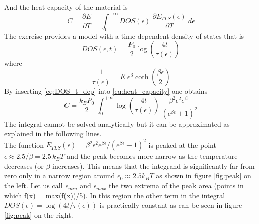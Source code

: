 \documentclass{article}
\begin{document}
And the heat capacity of the material is 
\begin{equation}
    C = \frac{\partial E}{\partial T} = \int_0^{+\infty} DOS(\epsilon) \ \frac{\partial E_{TLS}(\epsilon)}{\partial T} \ d\epsilon
    \label{eq:heat_capacity}
\end{equation}
The exercise provides a model with a time dependent density of states that is
\begin{equation}
    DOS(\epsilon, t) = \frac{P_0}{2}\log\left(\frac{4t}{\tau(\epsilon)}\right)
    \label{eq:DOS_t_dep}
\end{equation}
where
\begin{equation}
    \frac{1}{\tau(\epsilon)} = K \, \epsilon^3 \coth\left(\frac{\beta\epsilon}{2}\right)
    \label{eq:tau_eps}
\end{equation}
By inserting \ref{eq:DOS_t_dep} into \ref{eq:heat_capacity} one obtains
\begin{equation}
    C = \frac{k_BP_0}{2} \ \int_0^{+\infty} \log\left(\frac{4t}{\tau(\epsilon)}\right) \ \frac{\beta^2\epsilon^2 e^{\beta\epsilon}}{(e^{\beta \epsilon} + 1)^2}
    \label{eq:big_integral}
\end{equation}
The integral cannot be solved analytically but it can be approximated as explained in the following lines. \\
The function $E_{TLS}(\epsilon) = \beta^2\epsilon^2e^{\beta\epsilon}/(e^{\beta\epsilon} + 1)^2$ is peaked at the point
$\epsilon \approx 2.5/\beta = 2.5 \, k_B T$ and the peak becomes more narrow as the temperature decreases (or $\beta$ increases). This means that the integrand is significantly far from zero only 
in a narrow region around $\epsilon_0 \approx 2.5 k_B T$ as shown in figure \ref{fig:peak} on the left. Let us call $\epsilon_{min}$ and $\epsilon_{max}$ the two extrema of the peak area (points in which f(x) = max(f(x))/5). In this region the other term in the integral $DOS(\epsilon) = \log(4t/\tau(\epsilon))$
is practically constant as can be seen in figure \ref{fig:peak} on the right. 
\end{document}
